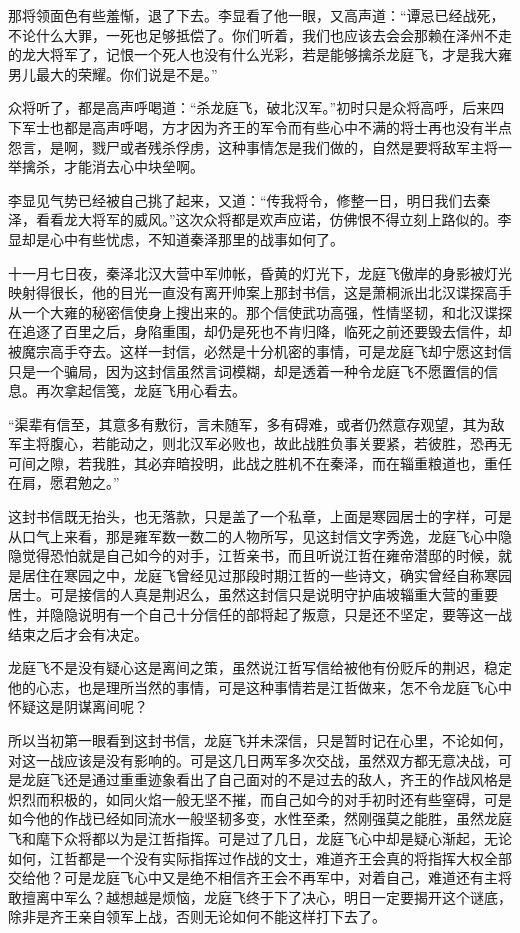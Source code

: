 那将领面色有些羞惭，退了下去。李显看了他一眼，又高声道：“谭忌已经战死，不论什么大罪，一死也足够抵偿了。你们听着，我们也应该去会会那赖在泽州不走的龙大将军了，记恨一个死人也没有什么光彩，若是能够擒杀龙庭飞，才是我大雍男儿最大的荣耀。你们说是不是。”

众将听了，都是高声呼喝道：“杀龙庭飞，破北汉军。”初时只是众将高呼，后来四下军士也都是高声呼喝，方才因为齐王的军令而有些心中不满的将士再也没有半点怨言，是啊，戮尸或者残杀俘虏，这种事情怎是我们做的，自然是要将敌军主将一举擒杀，才能消去心中块垒啊。

李显见气势已经被自己挑了起来，又道：“传我将令，修整一日，明日我们去秦泽，看看龙大将军的威风。”这次众将都是欢声应诺，仿佛恨不得立刻上路似的。李显却是心中有些忧虑，不知道秦泽那里的战事如何了。

十一月七日夜，秦泽北汉大营中军帅帐，昏黄的灯光下，龙庭飞傲岸的身影被灯光映射得很长，他的目光一直没有离开帅案上那封书信，这是萧桐派出北汉谍探高手从一个大雍的秘密信使身上搜出来的。那个信使武功高强，性情坚韧，和北汉谍探在追逐了百里之后，身陷重围，却仍是死也不肯归降，临死之前还要毁去信件，却被魔宗高手夺去。这样一封信，必然是十分机密的事情，可是龙庭飞却宁愿这封信只是一个骗局，因为这封信虽然言词模糊，却是透着一种令龙庭飞不愿置信的信息。再次拿起信笺，龙庭飞用心看去。

“渠辈有信至，其意多有敷衍，言未随军，多有碍难，或者仍然意存观望，其为敌军主将腹心，若能动之，则北汉军必败也，故此战胜负事关要紧，若彼胜，恐再无可间之隙，若我胜，其必弃暗投明，此战之胜机不在秦泽，而在辎重粮道也，重任在肩，愿君勉之。”

这封书信既无抬头，也无落款，只是盖了一个私章，上面是寒园居士的字样，可是从口气上来看，那是雍军数一数二的人物所写，见这封信文字秀逸，龙庭飞心中隐隐觉得恐怕就是自己如今的对手，江哲亲书，而且听说江哲在雍帝潜邸的时候，就是居住在寒园之中，龙庭飞曾经见过那段时期江哲的一些诗文，确实曾经自称寒园居士。可是接信的人真是荆迟么，虽然这封信只是说明守护庙坡辎重大营的重要性，并隐隐说明有一个自己十分信任的部将起了叛意，只是还不坚定，要等这一战结束之后才会有决定。

龙庭飞不是没有疑心这是离间之策，虽然说江哲写信给被他有份贬斥的荆迟，稳定他的心志，也是理所当然的事情，可是这种事情若是江哲做来，怎不令龙庭飞心中怀疑这是阴谋离间呢？

所以当初第一眼看到这封书信，龙庭飞并未深信，只是暂时记在心里，不论如何，对这一战应该是没有影响的。可是这几日两军多次交战，虽然双方都无意决战，可是龙庭飞还是通过重重迹象看出了自己面对的不是过去的敌人，齐王的作战风格是炽烈而积极的，如同火焰一般无坚不摧，而自己如今的对手初时还有些窒碍，可是如今他的作战已经如同流水一般坚韧多变，水性至柔，然刚强莫之能胜，虽然龙庭飞和麾下众将都以为是江哲指挥。可是过了几日，龙庭飞心中却是疑心渐起，无论如何，江哲都是一个没有实际指挥过作战的文士，难道齐王会真的将指挥大权全部交给他？可是龙庭飞心中又是绝不相信齐王会不再军中，对着自己，难道还有主将敢擅离中军么？越想越是烦恼，龙庭飞终于下了决心，明日一定要揭开这个谜底，除非是齐王亲自领军上战，否则无论如何不能这样打下去了。

